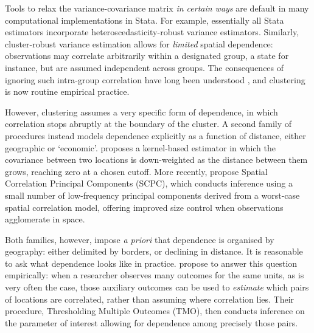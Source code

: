 \documentclass[varwidth,bib]{statapress}
\begin{document}
Tools to relax the variance-covariance matrix \textit{in certain ways} are default in many computational implementations in Stata.  For example, essentially all Stata estimators incorporate heteroscedasticity-robust variance estimators.  Similarly, cluster-robust variance estimation allows for \textit{limited} spatial dependence: observations may correlate arbitrarily within a designated group, a state for instance, but are assumed independent across groups.  The consequences of ignoring such intra-group correlation have long been understood \citep{Moulton1986,Moulton1990}, and clustering is now routine empirical practice.

However, clustering assumes a very specific form of dependence, in which correlation stops abruptly at the boundary of the cluster.  A second family of procedures instead models dependence explicitly as a function of distance, either geographic or `economic'.  \citet{Conley1999} proposes a kernel-based estimator in which the covariance between two locations is down-weighted as the distance between them grows, reaching zero at a chosen cutoff.  More recently, \citet{MullerWatson2022,MullerWatson2023} propose Spatial Correlation Principal Components (SCPC), which conducts inference using a small number of low-frequency principal components derived from a worst-case spatial correlation model, offering improved size control when observations agglomerate in space.

Both families, however, impose \textit{a priori} that dependence is organised by geography: either delimited by borders, or declining in distance.  It is reasonable to ask what dependence looks like in practice.  \citet{Dellavignaetal2025} propose to answer this question empirically: when a researcher observes many outcomes for the same units, as is very often the case, those auxiliary outcomes can be used to \textit{estimate} which pairs of locations are correlated, rather than assuming where correlation lies.  Their procedure, Thresholding Multiple Outcomes (TMO), then conducts inference on the parameter of interest allowing for dependence among precisely those pairs.
\end{document}
